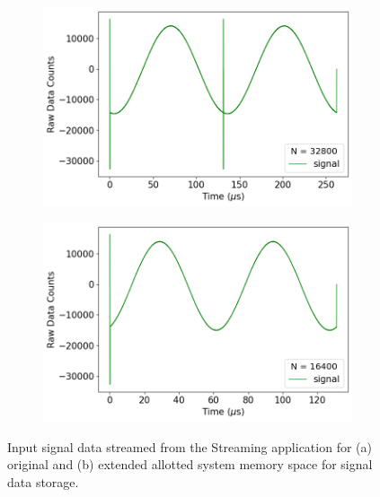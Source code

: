 
\begin{figure}[ht]
    \centering
    \begin{subfigure}[t]{0.47\linewidth}
        \centering
        \includegraphics[width=\textwidth]{images/chapter_2/2_stream/stream_3815Hz.png}
        \caption{}
        \label{fig:ch2_stream_3815Hz}
    \end{subfigure}
    \hspace{.025\linewidth}
    \begin{subfigure}[t]{0.47\linewidth}
        \centering
        \includegraphics[width=\textwidth]{images/chapter_2/2_stream/stream_7629Hz.png}
        \caption{}
        \label{fig:ch2_stream_7629Hz}
    \end{subfigure}
    \caption{Input signal data streamed from the Streaming application for (a) original and (b) extended allotted system memory space for signal data storage.}
    \label{fig:ch2_lipid_og_ex}
\end{figure}

